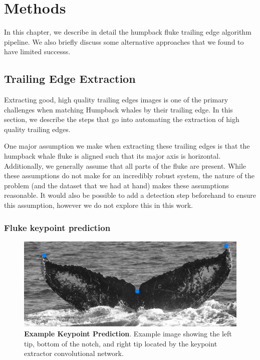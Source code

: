   
\chapter{Methods} \label{sec:methods}

In this chapter, we describe in detail the humpback fluke trailing edge algorithm pipeline.
We also briefly discuss some alternative approaches that we found to have limited successs.

\section{Trailing Edge Extraction}

Extracting good, high quality trailing edges images is one of the primary challenges when matching Humpback whales by their trailing edge.
In this section, we describe the steps that go into automating the extraction of high quality trailing edges.

One major assumption we make when extracting these trailing edges is that the humpback whale fluke is aligned such that its major axis is horizontal.
Additionally, we generally assume that all parts of the fluke are present.
While these assumptions do not make for an incredibly robust system, the nature of the problem (and the dataset that we had at hand) makes these assumptions reasonable.
It would also be possible to add a detection step beforehand to ensure this assumption, however we do not explore this in this work.


\subsection{Fluke keypoint prediction}


\begin{figure}[t]%
\centering
\includegraphics[width=1.0\textwidth]{../images/aid88_kpoverlay.png}
\caption{\textbf{Example Keypoint Prediction}. Example image showing the left tip, bottom of the notch, and right tip located by the keypoint extractor convolutional network.}
\label{fig:example_kp}
\end{figure}

